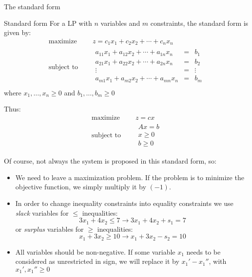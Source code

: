 \documentclass[c]{beamer}
\begin{document}
\begin{frame}{The standard form}

  \begin{block}{Standard form}
    For a LP with $n$ variables and $m$ constraints, the standard form is given by:
    \begin{equation*}
      \begin{aligned}
        \text{maximize } \quad & z = c_1x_1+c_2x_2 +\cdots + c_nx_n \\
        \text{subject to }\quad &
        \begin{array}{rcl}
          a_{11}x_1+a_{12}x_2+\cdots+a_{1n}x_n &= &b_1 \\
          a_{21}x_1+a_{22}x_2+\cdots+a_{2n}x_n &= &b_2 \\
          \vdots &=& \vdots\\
          a_{m1}x_1+a_{m2}x_2+\cdots+a_{mn}x_n &= &b_m \\
        \end{array}
      \end{aligned}
    \end{equation*}
    where $x_1,\ldots,x_n\geq0$ and $b_1,\ldots,b_m\geq0$
  \end{block}

Thus:
\begin{equation*}
  \begin{aligned}
    \text{maximize } \quad & z = cx \\
    \text{subject to }\quad &
    \begin{array}{c}
      Ax=b\\
      x\geq0\\
      b\geq0
    \end{array}
  \end{aligned}
\end{equation*}

\end{frame}

\begin{frame}
Of course, not always the system is proposed in this standard form, so\cite{carter}:
\begin{itemize}
  \item We need to leave a maximization problem. If the problem is to minimize the objective function, we simply multiply it by $(-1)$.
  \item In order to change inequality constraints into equality constraints we use {\it slack} variables for $\leq$ inequalities:
  \[
  3x_1+4x_2 \leq 7  \rightarrow  3x_1+4x_2+s_1 =7
  \]
  or {\it surplus} variables for $\geq$ inequalities:
  \[
  x_1+3x_2\geq 10 \rightarrow x_1+3x_2 -s_2 =10
  \]
  \item All variables should be non-negative. If some variable $x_1$ needs to be considered as unrestricted in sign, we will replace it by $x_1'-x_1''$, with $x_1',x_1''\geq 0$
\end{itemize}
\end{frame}
\end{document}
